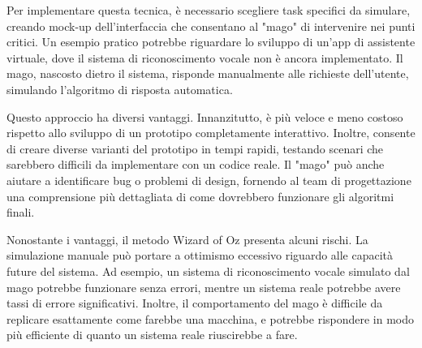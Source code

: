 Per implementare questa tecnica, è necessario scegliere task specifici da simulare, creando mock-up dell'interfaccia che consentano al "mago" di intervenire nei punti critici. Un esempio pratico potrebbe riguardare lo sviluppo di un’app di assistente virtuale, dove il sistema di riconoscimento vocale non è ancora implementato. Il mago, nascosto dietro il sistema, risponde manualmente alle richieste dell’utente, simulando l'algoritmo di risposta automatica.

Questo approccio ha diversi vantaggi. Innanzitutto, è più veloce e meno costoso rispetto allo sviluppo di un prototipo completamente interattivo. Inoltre, consente di creare diverse varianti del prototipo in tempi rapidi, testando scenari che sarebbero difficili da implementare con un codice reale. Il "mago" può anche aiutare a identificare bug o problemi di design, fornendo al team di progettazione una comprensione più dettagliata di come dovrebbero funzionare gli algoritmi finali.

Nonostante i vantaggi, il metodo Wizard of Oz presenta alcuni rischi. La simulazione manuale può portare a ottimismo eccessivo riguardo alle capacità future del sistema. Ad esempio, un sistema di riconoscimento vocale simulato dal mago potrebbe funzionare senza errori, mentre un sistema reale potrebbe avere tassi di errore significativi. Inoltre, il comportamento del mago è difficile da replicare esattamente come farebbe una macchina, e potrebbe rispondere in modo più efficiente di quanto un sistema reale riuscirebbe a fare.